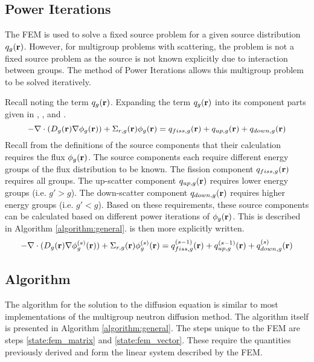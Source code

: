   \subsection{Power Iterations}
    \label{sec:power_iterations}
    The FEM is used to solve a fixed source problem for a given source
    distribution $q_g(\mathbf{r})$. However, for multigroup problems with scattering, 
    the problem is not a fixed source problem as the source is not known
    explicitly due to interaction between groups. The method of Power Iterations
    allows this multigroup problem to be solved iteratively.

    Recall  noting the term $q_g(\mathbf{r})$. Expanding the
    term $q_g(\mathbf{r})$ into its component parts given in ,
    , and . 
    \begin{equation} \label{eq:multigroup_source_expand}
      -\mathbf{\nabla} \cdot (D_g(\mathbf{r}) \mathbf{\nabla} \phi_g(\mathbf{r})) + \Sigma_{r,g}(\mathbf{r}) \phi_g(\mathbf{r}) 
        = q_{fiss,g}(\mathbf{r}) + q_{up,g}(\mathbf{r}) + q_{down,g}(\mathbf{r})
    \end{equation}
    Recall from the definitions of the source components that their calculation
    requires the flux $\phi_g(\mathbf{r})$. The source components each require
    different energy groups of the flux distribution to be known. The fission
    component $q_{fiss,g}(\mathbf{r})$ requires all groups. The up-scatter component
    $q_{up,g}(\mathbf{r})$ requires lower energy groups (i.e. $g' > g$). The
    down-scatter component $q_{down,g}(\mathbf{r})$ requires higher energy groups (i.e.
    $g' < g$). Based on these requirements, these source components can be
    calculated based on different power iterations of $\phi_g(\mathbf{r})$. This is
    described in Algorithm \ref{algorithm:general}.
     is then more explicitly written.
    \begin{equation} \label{eq:multigroup_power_iterations}
      -\mathbf{\nabla} \cdot (D_g(\mathbf{r}) \mathbf{\nabla} \phi_g^{(s)}(\mathbf{r})) + \Sigma_{r,g}(\mathbf{r})
      \phi_g^{(s)}(\mathbf{r}) = q_{fiss,g}^{(s-1)}(\mathbf{r}) + q_{up,g}^{(s-1)}(\mathbf{r}) +
      q_{down,g}^{(s)}(\mathbf{r})
    \end{equation}

  \subsection{Algorithm}
    The algorithm for the solution to the diffusion equation is similar to most
    implementations of the multigroup neutron diffusion method. The algorithm 
    itself is presented in Algorithm \ref{algorithm:general}. The steps unique 
    to the FEM are steps \ref{state:fem_matrix} and \ref{state:fem_vector}. 
    These require the quantities previously derived and form the linear system 
    described by the FEM. 
    

